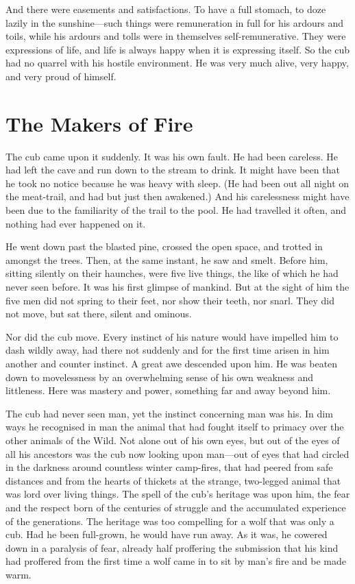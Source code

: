 \documentclass[10pt]{book}
\begin{document}
And there were easements and satisfactions. To have a full stomach, to
doze lazily in the sunshine—such things were remuneration in full for
his ardours and toils, while his ardours and tolls were in themselves
self-remunerative. They were expressions of life, and life is always
happy when it is expressing itself. So the cub had no quarrel with his
hostile environment. He was very much alive, very happy, and very proud
of himself.

\chapter{The Makers of Fire}

The cub came upon it suddenly. It was his own fault. He had been
careless. He had left the cave and run down to the stream to drink. It
might have been that he took no notice because he was heavy with sleep.
(He had been out all night on the meat-trail, and had but just then
awakened.) And his carelessness might have been due to the familiarity
of the trail to the pool. He had travelled it often, and nothing had
ever happened on it.

He went down past the blasted pine, crossed the open space, and trotted
in amongst the trees. Then, at the same instant, he saw and smelt.
Before him, sitting silently on their haunches, were five live things,
the like of which he had never seen before. It was his first glimpse of
mankind. But at the sight of him the five men did not spring to their
feet, nor show their teeth, nor snarl. They did not move, but sat
there, silent and ominous.

Nor did the cub move. Every instinct of his nature would have impelled
him to dash wildly away, had there not suddenly and for the first time
arisen in him another and counter instinct. A great awe descended upon
him. He was beaten down to movelessness by an overwhelming sense of his
own weakness and littleness. Here was mastery and power, something far
and away beyond him.

The cub had never seen man, yet the instinct concerning man was his. In
dim ways he recognised in man the animal that had fought itself to
primacy over the other animals of the Wild. Not alone out of his own
eyes, but out of the eyes of all his ancestors was the cub now looking
upon man—out of eyes that had circled in the darkness around countless
winter camp-fires, that had peered from safe distances and from the
hearts of thickets at the strange, two-legged animal that was lord over
living things. The spell of the cub’s heritage was upon him, the fear
and the respect born of the centuries of struggle and the accumulated
experience of the generations. The heritage was too compelling for a
wolf that was only a cub. Had he been full-grown, he would have run
away. As it was, he cowered down in a paralysis of fear, already half
proffering the submission that his kind had proffered from the first
time a wolf came in to sit by man’s fire and be made warm.
\end{document}
